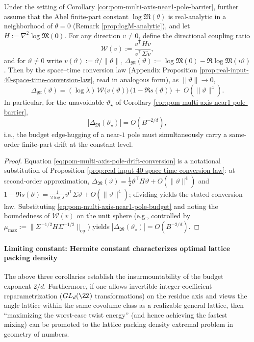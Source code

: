 \begin{corollary}\label{cor:pom-multi-axis-pole-drift-binding}
Under the setting of Corollary \ref{cor:pom-multi-axis-near1-pole-barrier}, further assume that the Abel finite-part constant \(\log\mathfrak{M}(\theta)\) is real-analytic in a neighborhood of \(\theta=0\) (Remark \ref{prop:logM-analytic}), and let
\(
H:=\nabla^2\log\mathfrak{M}(0)
\).
For any direction \(v\neq 0\), define the directional coupling ratio
\[
\mathcal{W}(v):=\frac{v^{\mathsf T}Hv}{v^{\mathsf T}\Sigma v},
\]
and for \(\vartheta\neq 0\) write \(v(\vartheta):=\vartheta/\|\vartheta\|\), \(\Delta_{\mathfrak{M}}(\vartheta):=\log\mathfrak{M}(0)-\Re\log\mathfrak{M}(i\vartheta)\).
Then by the space--time conversion law (Appendix Proposition \ref{prop:real-input-40-space-time-conversion-law}, read in analogous form), as \(\|\vartheta\|\to 0\),
\begin{equation}\label{eq:pom-multi-axis-pole-drift-conversion}
\Delta_{\mathfrak{M}}(\vartheta)
=(\log\lambda)\,\mathcal{W}\bigl(v(\vartheta)\bigr)\,\bigl(1-\Re s(\vartheta)\bigr)\ +\ O(\|\vartheta\|^4).
\end{equation}
In particular, for the unavoidable \(\vartheta_\star\) of Corollary \ref{cor:pom-multi-axis-near1-pole-barrier},
\[
|\Delta_{\mathfrak{M}}(\vartheta_\star)|=O(B^{-2/d}),
\]
i.e., the budget edge-hugging of a near-\(1\) pole must simultaneously carry a same-order finite-part drift at the constant level.
\end{corollary}

\begin{proof}
Equation \eqref{eq:pom-multi-axis-pole-drift-conversion} is a notational substitution of Proposition \ref{prop:real-input-40-space-time-conversion-law}: at second-order approximation,
\(
\Delta_{\mathfrak{M}}(\vartheta)=\frac12\vartheta^{\mathsf T}H\vartheta+O(\|\vartheta\|^4)
\)
and
\(
1-\Re s(\vartheta)=\frac{1}{2\log\lambda}\vartheta^{\mathsf T}\Sigma\vartheta+O(\|\vartheta\|^4)
\);
dividing yields the stated conversion law.
Substituting \eqref{eq:pom-multi-axis-near1-pole-budget} and noting the boundedness of \(\mathcal{W}(v)\) on the unit sphere (e.g., controlled by \(\mu_{\max}:=\|\Sigma^{-1/2}H\Sigma^{-1/2}\|_{\mathrm{op}}\)) yields \(|\Delta_{\mathfrak{M}}(\vartheta_\star)|=O(B^{-2/d})\).
\end{proof}

\paragraph{Limiting constant: Hermite constant characterizes optimal lattice packing density}
The above three corollaries establish the insurmountability of the budget exponent \(2/d\).
Furthermore, if one allows invertible integer-coefficient reparametrization (\(GL_d(\ZZ)\) transformations) on the residue axis and views the angle lattice within the same covolume class as a realizable general lattice, then ``maximizing the worst-case twist energy'' (and hence achieving the fastest mixing) can be promoted to the lattice packing density extremal problem in geometry of numbers.

